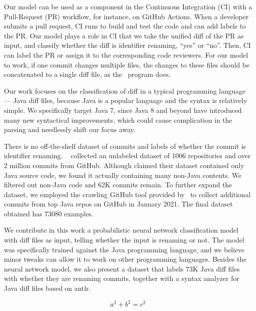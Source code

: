 Our model can be used as a component in the Continuous Integration (CI) with a Pull-Request (PR) workflow, for instance, on GitHub Actions.
When a developer submits a pull request, CI runs to build and test the code and can add labels to the PR.
Our model plays a role in CI that we take the unified diff of the PR as input,
and classify whether the diff is identifier renaming, ``yes'' or ``no''.
Then, CI can label the PR or assign it to the corresponding code reviewers.
For our model to work, if one commit changes multiple files,
the changes to these files should be concatenated to a single diff file,
as the~{\gitdiff} program does.

Our work focuses on the classification of diff in a typical programming language
--- Java diff files,
because Java is a popular language and the syntax is relatively simple.
We specifically target Java 7, since Java 8 and beyond have introduced many new syntactical improvements,
which could cause complication in the parsing and needlessly shift our focus away.

There is no off-the-shelf dataset of commits and labels of whether the commit is identifier renaming.
~\cite{jiang2017} collected an unlabeled dataset of \num{1006} repositories and over 2 million commits from GitHub.
Although  claimed their dataset contained only Java source code,
we found it actually containing many non-Java contents.
We filtered out non-Java code and 62K commits remain.
To further expand the dataset, we employed the crawling GitHub tool provided by~\cite{alexandru2017replicating} to collect additional commits from top Java repos on GitHub in January 2021.
The final dataset obtained has \num{73080} examples.

We contribute in this work a probabilistic neural network classification model with diff files as input, telling whether the input is renaming or not.
The model was specifically trained against the Java programming language, and
we believe minor tweaks can allow it to work on other programming languages.
Besides the neural network model, we also present a dataset that labels 73K Java diff files with whether they are renaming commits,
together with a syntax analyzer for Java diff files based on {\sc antlr}.






\begin{equation}\label{eq:sample1}
	a^2 + b^2 = c^2
\end{equation}

